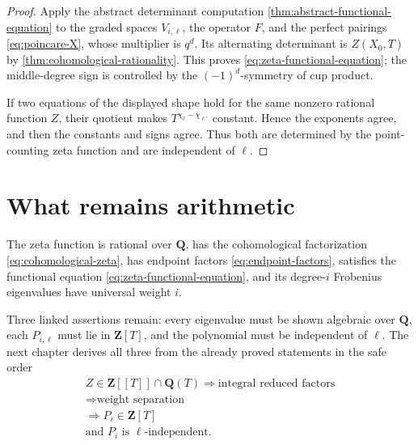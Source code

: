 \begin{proof}
Apply the abstract determinant computation
\cref{thm:abstract-functional-equation} to the graded spaces
\(V_{i,\ell}\), the operator \(F\), and the perfect pairings
\eqref{eq:poincare-X}, whose multiplier is \(q^d\).  Its alternating
determinant is \(Z(X_0,T)\) by
\cref{thm:cohomological-rationality}.  This proves
\eqref{eq:zeta-functional-equation}; the middle-degree sign is controlled by
the \((-1)^d\)-symmetry of cup product.

If two equations of the displayed shape hold for the same nonzero rational
function \(Z\), their quotient makes
\(T^{\chi_\ell-\chi_{\ell'}}\) constant.  Hence the exponents agree, and then
the constants and signs agree.  Thus both are determined by the
point-counting zeta function and are independent of \(\ell\).
\end{proof}

\section{What remains arithmetic}

\begin{corollary}
\label{cor:weil-before-integrality}
The zeta function is rational over \(\mathbf Q\), has the cohomological
factorization \eqref{eq:cohomological-zeta}, has endpoint factors
\eqref{eq:endpoint-factors}, satisfies the functional equation
\eqref{eq:zeta-functional-equation}, and its degree-\(i\) Frobenius
eigenvalues have universal weight \(i\).
\end{corollary}

Three linked assertions remain: every eigenvalue must be shown algebraic over
\(\mathbf Q\), each \(P_{i,\ell}\) must lie in \(\mathbf Z[T]\), and the
polynomial must be independent of \(\ell\).  The next chapter derives all
three from the already proved statements in the safe order
\[
\begin{gathered}
  Z\in\mathbf Z[[T]]\cap\mathbf Q(T)
  \Longrightarrow\text{integral reduced factors}\\
  \Longrightarrow\text{weight separation}\\
  \Longrightarrow P_i\in\mathbf Z[T]\\
  \text{and \(P_i\) is \(\ell\)-independent}.
\end{gathered}
\]


